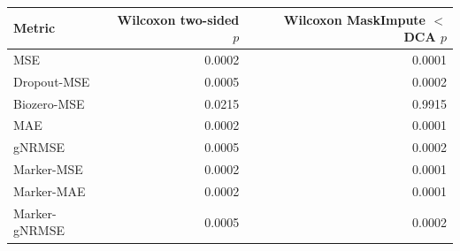 \begin{tabular}{@{}lrr@{}}
\toprule
Metric & Wilcoxon two-sided $p$ & Wilcoxon MaskImpute $<$ DCA $p$ \\
\midrule
MSE & 0.0002 & 0.0001 \\
Dropout-MSE & 0.0005 & 0.0002 \\
Biozero-MSE & 0.0215 & 0.9915 \\
MAE & 0.0002 & 0.0001 \\
gNRMSE & 0.0005 & 0.0002 \\
Marker-MSE & 0.0002 & 0.0001 \\
Marker-MAE & 0.0002 & 0.0001 \\
Marker-gNRMSE & 0.0005 & 0.0002 \\
\bottomrule
\end{tabular}
